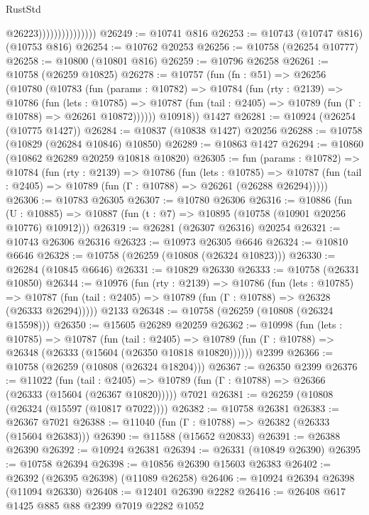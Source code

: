 \begin{lexlean}{RustStd}
\begin{coremodule}
                                  @26223)))))))))))))))
@26249 := @10741 @816
@26253 := @10743 (@10747 @816) (@10753 @816)
@26254 := @10762 @20253
@26256 := @10758 (@26254 @10777)
@26258 := @10800 (@10801 @816)
@26259 := @10796 @26258
@26261 := @10758 (@26259 @10825)
@26278 := @10757
    (fun (fn : @51) =>
    @26256
      (@10780
        (@10783
          (fun (params : @10782) =>
          @10784
            (fun (rty : @2139) =>
            @10786
              (fun (lets : @10785) =>
              @10787 (fun (tail : @2405) => @10789 (fun (Γ : @10788) => @26261 @10872))))))
        @10918))
    @1427
@26281 := @10924 (@26254 (@10775 @1427))
@26284 := @10837 (@10838 @1427) @20256
@26288 := @10758 (@10829 (@26284 @10846) @10850)
@26289 := @10863 @1427
@26294 := @10860 (@10862 @26289 @20259 @10818 @10820)
@26305 := fun (params : @10782) =>
  @10784
    (fun (rty : @2139) =>
    @10786
      (fun (lets : @10785) =>
      @10787 (fun (tail : @2405) => @10789 (fun (Γ : @10788) => @26261 (@26288 @26294)))))
@26306 := @10783 @26305
@26307 := @10780 @26306
@26316 := @10886
    (fun (U : @10885) => @10887 (fun (t : @7) => @10895 (@10758 (@10901 @20256 @10776) @10912)))
@26319 := @26281 (@26307 @26316) @20254
@26321 := @10743 @26306 @26316
@26323 := @10973 @26305 @6646
@26324 := @10810 @6646
@26328 := @10758 (@26259 (@10808 (@26324 @10823)))
@26330 := @26284 (@10845 @6646)
@26331 := @10829 @26330
@26333 := @10758 (@26331 @10850)
@26344 := @10976
    (fun (rty : @2139) =>
    @10786
      (fun (lets : @10785) =>
      @10787 (fun (tail : @2405) => @10789 (fun (Γ : @10788) => @26328 (@26333 @26294)))))
    @2133
@26348 := @10758 (@26259 (@10808 (@26324 @15598)))
@26350 := @15605 @26289 @20259
@26362 := @10998
    (fun (lets : @10785) =>
    @10787
      (fun (tail : @2405) =>
      @10789 (fun (Γ : @10788) => @26348 (@26333 (@15604 (@26350 @10818 @10820))))))
    @2399
@26366 := @10758 (@26259 (@10808 (@26324 @18204)))
@26367 := @26350 @2399
@26376 := @11022
    (fun (tail : @2405) => @10789 (fun (Γ : @10788) => @26366 (@26333 (@15604 (@26367 @10820)))))
    @7021
@26381 := @26259 (@10808 (@26324 (@15597 (@10817 @7022))))
@26382 := @10758 @26381
@26383 := @26367 @7021
@26388 := @11040 (fun (Γ : @10788) => @26382 (@26333 (@15604 @26383)))
@26390 := @11588 (@15652 @20833)
@26391 := @26388 @26390
@26392 := @10924 @26381
@26394 := @26331 (@10849 @26390)
@26395 := @10758 @26394
@26398 := @10856 @26390 @15603 @26383
@26402 := @26392 (@26395 @26398) (@11089 @26258)
@26406 := @10924 @26394 @26398 (@11094 @26330)
@26408 := @12401 @26390 @2282
@26416 := @26408 @617 @1425 @885 @88 @2399 @7019 @2282 @1052

\end{coremodule}
\end{lexlean}
